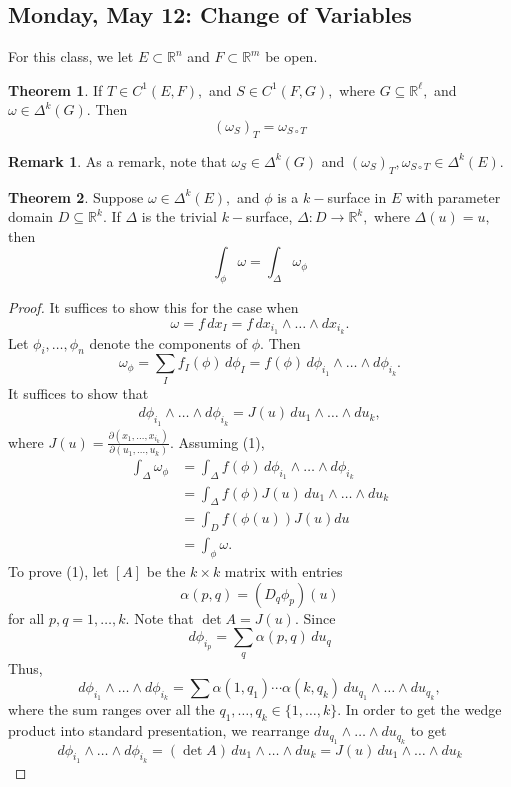 \documentclass[10pt, oneside]{article}
\newcommand{\bbR}{\mathbb{R}}
\theoremstyle{definition}
\newtheorem{thm}{Theorem}
\newtheorem{rem}{Remark}
\begin{document}
\subsection{Monday, May 12: Change of Variables}
For this class, we let $E\subset \bbR^n$ and $F\subset\bbR^m$ be open.
\begin{thm}
    If $T \in C^1(E, F),$ and $S\in C^1(F, G),$ where $G \subseteq \bbR^\ell,$ and $\omega\in \Delta^k(G).$   Then 
    \[(\omega_S)_T = \omega_{S\circ T}\]
\end{thm}
\begin{rem}
    As a remark, note that $\omega_S \in \Delta^k(G)$ and $(\omega_S)_T, \omega_{S\circ T} \in \Delta^k(E).$
\end{rem}
\begin{thm}
    Suppose $\omega\in \Delta^k(E),$ and $\phi$ is a $k-$surface in $E$ with parameter domain $D\subseteq \bbR^k.$ If $\Delta$ is the trivial $k-$surface, $\Delta: D\to \bbR^k,$ where $\Delta(u) = u,$ then 
    \[\int_\phi \omega = \int_\Delta \omega_\phi\]
\end{thm}
\begin{proof}
    It suffices to show this for the case when 
    \[\omega = f\,dx_I = f\,dx_{i_1}\wedge \dots \wedge dx_{i_k}.\] Let $\phi_i, \dots, \phi_n$ denote the components of $\phi.$ Then 
    \[\omega_\phi = \sum_{I} f_I(\phi)\,d\phi_I = f(\phi)\,d\phi_{i_1}\wedge \dots \wedge d\phi_{i_k}.\] It suffices to show that
    \begin{align}
    d\phi_{i_1}\wedge \dots \wedge d\phi_{i_k} = J (u) \,du_1\wedge \dots \wedge du_k, 
    \end{align}
     where $J(u) = \frac{\partial (x_1, \dots, x_{i_k})}{\partial (u_1, \dots, u_k)}.$ Assuming (1), 
     \begin{align*}
         \int_\Delta \omega_\phi &= \int_\Delta f(\phi)\,d\phi_{i_1}\wedge \dots \wedge d\phi_{i_k}\\
         &= \int_\Delta f(\phi) J(u) \,du_1\wedge \dots \wedge du_k\\
         &= \int_D f(\phi (u))J(u)du\\
         &= \int_\phi \omega.
     \end{align*}
     To prove (1), let $[A]$ be the $k\times k$ matrix with entries
     \[\alpha(p,q) = (D_q\phi_p)(u)\] for all $p,q = 1,\dots, k.$ Note that $\det A = J(u).$ Since 
     \[d\phi_{i_p} = \sum_{q}\alpha(p,q)\,du_{q}\] Thus, 
     \[d\phi_{i_1}\wedge \dots \wedge d\phi_{i_k} = \sum \alpha(1,q_1)\cdots \alpha(k,q_k) \,du_{q_1}\wedge \dots \wedge du_{q_k},\] where the sum ranges over all the $q_1, \dots, q_k \in \{1,\dots, k\}.$ In order to get the wedge product into standard presentation, we rearrange 
     $du_{q_1}\wedge \dots \wedge du_{q_k}$ to get 
     \[d\phi_{i_1}\wedge \dots \wedge d\phi_{i_k} = (\det A)\, du_1 \wedge \dots \wedge du_k = J(u)\,du_1 \wedge \dots \wedge du_k\]
 \end{proof}
\end{document}

